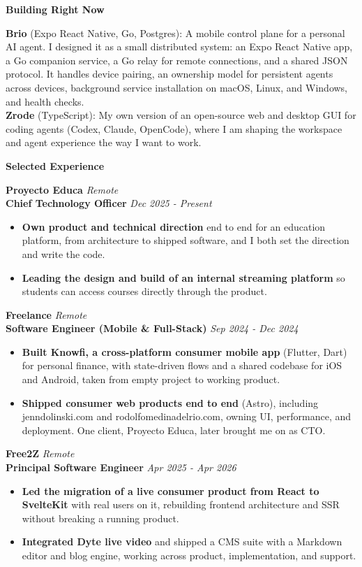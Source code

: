 \documentclass[10pt]{article}
\newcommand{\sectiontitle}[1]{%
    \vspace{5pt}
    \begin{center}
        \textbf{#1}
    \end{center}
    \vspace{-6pt}
}
\begin{document}
\sectiontitle{Building Right Now}
\textbf{Brio} (Expo React Native, Go, Postgres): A mobile control plane for a personal AI agent. I designed it as a small distributed system: an Expo React Native app, a Go companion service, a Go relay for remote connections, and a shared JSON protocol. It handles device pairing, an ownership model for persistent agents across devices, background service installation on macOS, Linux, and Windows, and health checks. \\
\textbf{Zrode} (TypeScript): My own version of an open-source web and desktop GUI for coding agents (Codex, Claude, OpenCode), where I am shaping the workspace and agent experience the way I want to work. \\

\sectiontitle{Selected Experience}

\textbf{Proyecto Educa} \hfill \textit{Remote} \\
\textbf{Chief Technology Officer} \hfill \textit{Dec 2025 - Present}
\begin{itemize}
    \item \textbf{Own product and technical direction} end to end for an education platform, from architecture to shipped software, and I both set the direction and write the code.
    \item \textbf{Leading the design and build of an internal streaming platform} so students can access courses directly through the product.
\end{itemize}

\vspace{4pt}
\textbf{Freelance} \hfill \textit{Remote} \\
\textbf{Software Engineer (Mobile \& Full-Stack)} \hfill \textit{Sep 2024 - Dec 2024}
\begin{itemize}
    \item \textbf{Built Knowfi, a cross-platform consumer mobile app} (Flutter, Dart) for personal finance, with state-driven flows and a shared codebase for iOS and Android, taken from empty project to working product.
    \item \textbf{Shipped consumer web products end to end} (Astro), including jenndolinski.com and rodolfomedinadelrio.com, owning UI, performance, and deployment. One client, Proyecto Educa, later brought me on as CTO.
\end{itemize}

\vspace{4pt}
\textbf{Free2Z} \hfill \textit{Remote} \\
\textbf{Principal Software Engineer} \hfill \textit{Apr 2025 - Apr 2026}
\begin{itemize}
    \item \textbf{Led the migration of a live consumer product from React to SvelteKit} with real users on it, rebuilding frontend architecture and SSR without breaking a running product.
    \item \textbf{Integrated Dyte live video} and shipped a CMS suite with a Markdown editor and blog engine, working across product, implementation, and support.
\end{itemize}
\end{document}
